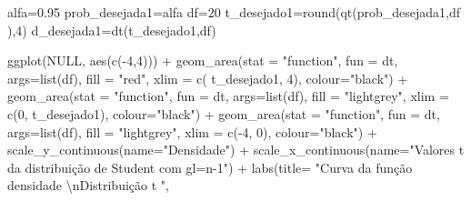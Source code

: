 \documentclass[
]{book}
\newenvironment{Shaded}{\begin{snugshade}}{\end{snugshade}}
\newcommand{\AttributeTok}[1]{\textcolor[rgb]{0.77,0.63,0.00}{#1}}
\newcommand{\ConstantTok}[1]{\textcolor[rgb]{0.00,0.00,0.00}{#1}}
\newcommand{\DecValTok}[1]{\textcolor[rgb]{0.00,0.00,0.81}{#1}}
\newcommand{\FloatTok}[1]{\textcolor[rgb]{0.00,0.00,0.81}{#1}}
\newcommand{\FunctionTok}[1]{\textcolor[rgb]{0.00,0.00,0.00}{#1}}
\newcommand{\NormalTok}[1]{#1}
\newcommand{\OtherTok}[1]{\textcolor[rgb]{0.56,0.35,0.01}{#1}}
\newcommand{\SpecialCharTok}[1]{\textcolor[rgb]{0.00,0.00,0.00}{#1}}
\newcommand{\StringTok}[1]{\textcolor[rgb]{0.31,0.60,0.02}{#1}}
\begin{document}
\begin{Shaded}
\begin{Highlighting}[]
\NormalTok{alfa}\OtherTok{=}\FloatTok{0.95}
\NormalTok{prob\_desejada1}\OtherTok{=}\NormalTok{alfa}
\NormalTok{df}\OtherTok{=}\DecValTok{20}
\NormalTok{t\_desejado1}\OtherTok{=}\FunctionTok{round}\NormalTok{(}\FunctionTok{qt}\NormalTok{(prob\_desejada1,df ),}\DecValTok{4}\NormalTok{)}
\NormalTok{d\_desejada1}\OtherTok{=}\FunctionTok{dt}\NormalTok{(t\_desejado1,df)}

\FunctionTok{ggplot}\NormalTok{(}\ConstantTok{NULL}\NormalTok{, }\FunctionTok{aes}\NormalTok{(}\FunctionTok{c}\NormalTok{(}\SpecialCharTok{{-}}\DecValTok{4}\NormalTok{,}\DecValTok{4}\NormalTok{))) }\SpecialCharTok{+}
  \FunctionTok{geom\_area}\NormalTok{(}\AttributeTok{stat =} \StringTok{"function"}\NormalTok{, }
            \AttributeTok{fun =}\NormalTok{ dt,}
            \AttributeTok{args=}\FunctionTok{list}\NormalTok{(df), }
            \AttributeTok{fill =} \StringTok{"red"}\NormalTok{, }
            \AttributeTok{xlim =} \FunctionTok{c}\NormalTok{( t\_desejado1, }\DecValTok{4}\NormalTok{),}
            \AttributeTok{colour=}\StringTok{"black"}\NormalTok{) }\SpecialCharTok{+}
  \FunctionTok{geom\_area}\NormalTok{(}\AttributeTok{stat =} \StringTok{"function"}\NormalTok{, }
            \AttributeTok{fun =}\NormalTok{ dt, }
            \AttributeTok{args=}\FunctionTok{list}\NormalTok{(df), }
            \AttributeTok{fill =} \StringTok{"lightgrey"}\NormalTok{, }
            \AttributeTok{xlim =} \FunctionTok{c}\NormalTok{(}\DecValTok{0}\NormalTok{, t\_desejado1),}
            \AttributeTok{colour=}\StringTok{"black"}\NormalTok{) }\SpecialCharTok{+}
  \FunctionTok{geom\_area}\NormalTok{(}\AttributeTok{stat =} \StringTok{"function"}\NormalTok{, }
            \AttributeTok{fun =}\NormalTok{ dt, }
            \AttributeTok{args=}\FunctionTok{list}\NormalTok{(df), }
            \AttributeTok{fill =} \StringTok{"lightgrey"}\NormalTok{, }
            \AttributeTok{xlim =} \FunctionTok{c}\NormalTok{(}\SpecialCharTok{{-}}\DecValTok{4}\NormalTok{, }\DecValTok{0}\NormalTok{),}
            \AttributeTok{colour=}\StringTok{"black"}\NormalTok{) }\SpecialCharTok{+}
  \FunctionTok{scale\_y\_continuous}\NormalTok{(}\AttributeTok{name=}\StringTok{"Densidade"}\NormalTok{) }\SpecialCharTok{+}
  \FunctionTok{scale\_x\_continuous}\NormalTok{(}\AttributeTok{name=}\StringTok{"Valores \textasciigrave{}\textasciigrave{}t\textquotesingle{}\textquotesingle{} da distribuição de Student com gl=n{-}1"}\NormalTok{)  }\SpecialCharTok{+}
  \FunctionTok{labs}\NormalTok{(}\AttributeTok{title=} \StringTok{"Curva da função densidade }\SpecialCharTok{\textbackslash{}n}\StringTok{Distribuição t "}\NormalTok{, }

\end{Highlighting}
\end{Shaded}
\end{document}
